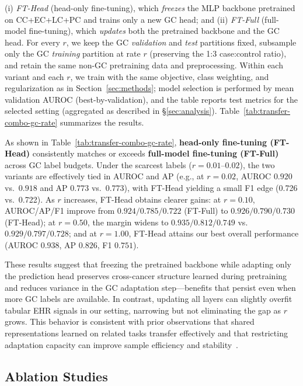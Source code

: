 \documentclass[diagnostics,article,submit,pdftex,moreauthors]{Definitions/mdpi}
\begin{document}
(i) \emph{FT-Head} (head-only fine-tuning), which \emph{freezes} the MLP backbone pretrained on CC+EC+LC+PC and trains only a new GC head; and
(ii) \emph{FT-Full} (full-model fine-tuning), which \emph{updates} both the pretrained backbone and the GC head.
For every $r$, we keep the GC \emph{validation} and \emph{test} partitions fixed, subsample only the GC \emph{training} partition at rate $r$ (preserving the 1{:}3 case:control ratio), and retain the same non-GC pretraining data and preprocessing.
Within each variant and each $r$, we train with the same objective, class weighting, and regularization as in Section~\ref{sec:methods}; model selection is performed by mean validation AUROC (best-by-validation), and the table reports test metrics for the selected setting (aggregated as described in \S\ref{sec:analysis}).
Table~\ref{tab:transfer-combo-gc-rate} summarizes the results.

As shown in Table~\ref{tab:transfer-combo-gc-rate}, \textbf{head-only fine-tuning (FT-Head)} consistently matches or exceeds \textbf{full-model fine-tuning (FT-Full)} across GC label budgets. Under the scarcest labels ($r{=}0.01$–$0.02$), the two variants are effectively tied in AUROC and AP (e.g., at $r{=}0.02$, AUROC $0.920$ vs.\ $0.918$ and AP $0.773$ vs.\ $0.773$), with FT-Head yielding a small F1 edge (0.726 vs.\ 0.722). As $r$ increases, FT-Head obtains clearer gains: at $r{=}0.10$, AUROC/AP/F1 improve from $0.924/0.785/0.722$ (FT-Full) to $0.926/0.790/0.730$ (FT-Head); at $r{=}0.50$, the margin widens to $0.935/0.812/0.749$ vs.\ $0.929/0.797/0.728$; and at $r{=}1.00$, FT-Head attains our best overall performance (AUROC $0.938$, AP $0.826$, F1 $0.751$).

These results suggest that freezing the pretrained backbone while adapting only the prediction head preserves cross-cancer structure learned during pretraining and reduces variance in the GC adaptation step—benefits that persist even when more GC labels are available. In contrast, updating all layers can slightly overfit tabular EHR signals in our setting, narrowing but not eliminating the gap as $r$ grows. This behavior is consistent with prior observations that shared representations learned on related tasks transfer effectively and that restricting adaptation capacity can improve sample efficiency and stability~\citep{Caruana1997_MTL,Pan2010_TLsurvey,Yosinski2014_transferable}.



\subsection{Ablation Studies}
\end{document}

